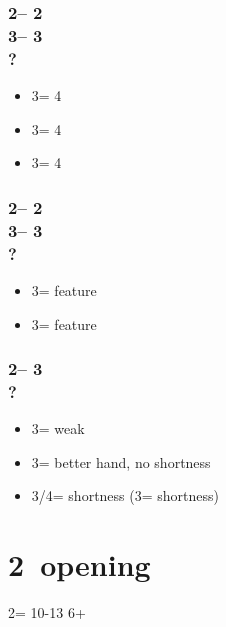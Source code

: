 \documentclass[12pt, a4paper]{report}
\begin{document}
{{{            \subsubsection*{2\hearts -- 2\nt\\
                            3\clubs -- 3\diams\\
                            ?}
            \begin{itemize}
                \item 3\hearts = 4\spades
                \item 3\spades = 4\clubs
                \item 3\nt = 4\diams
            \end{itemize}

            \subsubsection*{2\hearts -- 2\nt\\
                            3\diams -- 3\hearts\\
                            ?}
            \begin{itemize}
                \item 3\spades = \clubs feature
                \item 3\nt = \diams feature
            \end{itemize}

            \subsubsection*{2\hearts -- 3\diams\\
                            ?}
            \begin{itemize}
                \item 3\hearts = weak
                \item 3\spades = better hand, no shortness
                \item 3\nt/4\minor = shortness (3\nt = \spades shortness)
            \end{itemize}
        }

        \section*{\colorbox{blue!30}{2\spades\ opening}}
         {

            2\spades = 10-13 6+\spades

}}}
\end{document}
